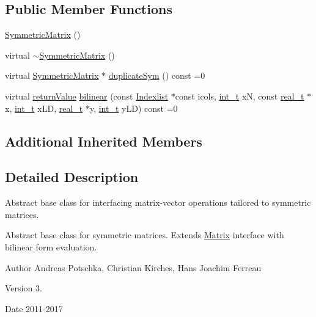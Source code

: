\subsection*{Public Member Functions}
\begin{DoxyCompactItemize}
\item 
\hyperlink{class_symmetric_matrix_a74050d9aa95d68b583c115146dda9387}{Symmetric\+Matrix} ()
\item 
virtual \hyperlink{class_symmetric_matrix_a2f6124a2b8c9e512302f73460bb6a9d3}{$\sim$\+Symmetric\+Matrix} ()
\item 
virtual \hyperlink{class_symmetric_matrix}{Symmetric\+Matrix} $\ast$ \hyperlink{class_symmetric_matrix_a4dacd5fe6d12b5082a90a7336669fce7}{duplicate\+Sym} () const =0
\item 
virtual \hyperlink{_message_handling_8hpp_a81d556f613bfbabd0b1f9488c0fa865e}{return\+Value} \hyperlink{class_symmetric_matrix_a7a51814e064dc1898b0916c8f2ceadc8}{bilinear} (const \hyperlink{class_indexlist}{Indexlist} $\ast$const icols, \hyperlink{_types_8hpp_ab6fd6105e64ed14a0c9281326f05e623}{int\+\_\+t} xN, const \hyperlink{qp_o_a_s_e_s__wrapper_8h_a0d00e2b3dfadee81331bbb39068570c4}{real\+\_\+t} $\ast$x, \hyperlink{_types_8hpp_ab6fd6105e64ed14a0c9281326f05e623}{int\+\_\+t} x\+LD, \hyperlink{qp_o_a_s_e_s__wrapper_8h_a0d00e2b3dfadee81331bbb39068570c4}{real\+\_\+t} $\ast$y, \hyperlink{_types_8hpp_ab6fd6105e64ed14a0c9281326f05e623}{int\+\_\+t} y\+LD) const =0
\end{DoxyCompactItemize}
\subsection*{Additional Inherited Members}


\subsection{Detailed Description}
Abstract base class for interfacing matrix-\/vector operations tailored to symmetric matrices. 

Abstract base class for symmetric matrices. Extends \hyperlink{class_matrix}{Matrix} interface with bilinear form evaluation.

\begin{DoxyAuthor}{Author}
Andreas Potschka, Christian Kirches, Hans Joachim Ferreau 
\end{DoxyAuthor}
\begin{DoxyVersion}{Version}
3. 
\end{DoxyVersion}
\begin{DoxyDate}{Date}
2011-\/2017 
\end{DoxyDate}


